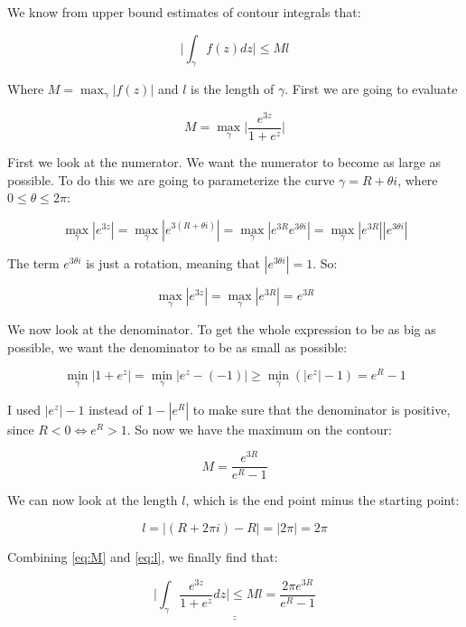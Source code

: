 \documentclass[a4paper,norsk, 10pt]{article}
\begin{document}
We know from upper bound estimates of contour integrals that:

$$
\bigg| \int_{\gamma} f(z) dz \bigg| \leq M l 
$$

Where $M = \max_{\gamma} |f(z)|$ and $l$ is the length of $\gamma$. First we are going to evaluate

$$
M = \max_{\gamma}\bigg|\frac{e^{3z}}{1+e^z}\bigg|
$$

First we look at the numerator. We want the numerator to become as large as possible. To do this we are going to parameterize the curve $\gamma = R + \theta i$, where $0\leq \theta \leq 2\pi$:

$$
\max_ {\gamma} |e^{3z}| = \max_ {\gamma} |e^{3(R + \theta i)}| = \max_ {\gamma} |e^{3R}e^{3\theta i}|=\max_ {\gamma} |e^{3R}||e^{3\theta i}|
$$

The term $e^{3\theta i}$ is just a rotation, meaning that $|e^{3\theta i}| = 1$. So:

\begin{equation}
\max_ {\gamma} |e^{3z}| = \max_ {\gamma} |e^{3R}| = e^{3R}
\label{eq:maxNum}
\end{equation}

We now look at the denominator. To get the whole expression to be as big as possible, we want the denominator to be as small as possible:

$$
\min_{\gamma} |1+ e^z| = \min_{\gamma}|e^z - (-1)| \geq \min_{\gamma}(|e^z| - 1) = e^R -1
$$

I used $|e^z| - 1$ instead of $1-|e^R|$ to make sure that the denominator is positive, since $R<0 \Leftrightarrow e^R > 1$. So now we have the maximum on the contour:

\begin{equation}
M = \frac{e^{3R}}{e^R - 1}
\label{eq:M}
\end{equation}

We can now look at the length $l$, which is the end point minus the starting point:

\begin{equation}
l = |(R + 2\pi i) - R | = |2\pi| = 2\pi
\label{eq:l}
\end{equation}

Combining \eqref{eq:M} and \eqref{eq:l}, we finally find that:

$$
\underline{\underline{\bigg| \int_{\gamma} \frac{e^{3z}}{1+e^z} dz \bigg| \leq M l = \frac{2\pi e^{3R}}{e^R-1}}}
$$
\end{document}
